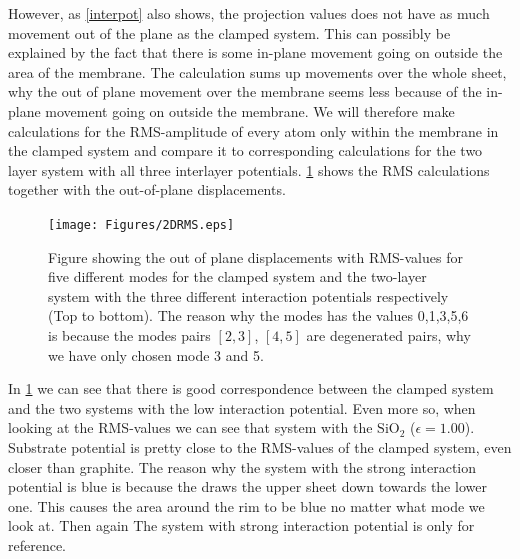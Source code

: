 However, as \cref{interpot} also shows, the projection values does not have as much movement out of the plane as the clamped system. This can possibly be explained by the fact that there is some in-plane movement going on outside the area of the membrane. The calculation sums up movements over the whole sheet, why the out of plane movement over the membrane seems less because of the in-plane movement going on outside the membrane. We will therefore make calculations for the RMS-amplitude of every atom only within the membrane in the clamped system and compare it to corresponding calculations for the two layer system with all three interlayer potentials. \cref{2DRMS} shows the RMS calculations together with the out-of-plane displacements. 
\onecolumngrid

\begin{figure}[H]
    \centering
    \texttt{[image: Figures/2DRMS.eps]}
    \caption{Figure showing the out of plane displacements with RMS-values for five different modes for the clamped system and the two-layer system with the three different interaction potentials respectively (Top to bottom). The reason why the modes has the values 0,1,3,5,6 is because the modes pairs $[2,3]$, $[4,5]$ are degenerated pairs, why we have only chosen mode 3 and 5. }
    \label{2DRMS}
\end{figure}
\twocolumngrid

In \cref{2DRMS} we can see that there is good correspondence between the clamped system and the two systems with the low interaction potential. Even more so, when looking at the RMS-values we can see that system with the $\text{SiO}_{2}$ ($\epsilon=1.00$). Substrate potential is pretty close to the RMS-values of the clamped system, even closer than graphite. The reason why the system with the strong interaction potential is blue is because the draws the upper sheet down towards the lower one. This causes the area around the rim to be blue no matter what mode we look at. Then again The system with strong interaction potential is only for reference. 